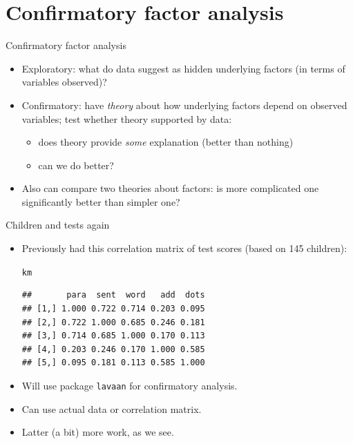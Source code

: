 \documentclass[unknownkeysallowed]{beamer}\usepackage[]{graphicx}\usepackage[]{color}
\makeatletter
\newcommand{\hlstd}[1]{\textcolor[rgb]{0.345,0.345,0.345}{#1}}%
\newenvironment{kframe}{%
 \def\at@end@of@kframe{}%
 \ifinner\ifhmode%
  \def\at@end@of@kframe{\end{minipage}}%
  \begin{minipage}{\columnwidth}%
 \fi\fi%
 \def\FrameCommand##1{\hskip\@totalleftmargin \hskip-\fboxsep
 \colorbox{shadecolor}{##1}\hskip-\fboxsep
     \hskip-\linewidth \hskip-\@totalleftmargin \hskip\columnwidth}%
 \MakeFramed {\advance\hsize-\width
   \@totalleftmargin\z@ \linewidth\hsize
   \@setminipage}}%
 {\par\unskip\endMakeFramed%
 \at@end@of@kframe}
\newenvironment{knitrout}{}{} %
\makeatother
\begin{document}
\section{Confirmatory factor analysis}
\frame{\sectionpage}


\begin{frame}[fragile]{Confirmatory factor analysis}

  \begin{itemize}
  \item Exploratory: what do data suggest as hidden underlying factors (in terms of variables observed)?
  \item Confirmatory: have {\em theory} about how underlying factors depend on observed variables; test whether theory supported by data:
    \begin{itemize}
    \item does theory provide {\em some} explanation (better than nothing)
    \item can we do better?
    \end{itemize}
  \item Also can compare two theories about factors: is more complicated one significantly better than simpler one?
  \end{itemize}
  
\end{frame}

\begin{frame}[fragile]{Children and tests again}

\begin{itemize}
\item
Previously had this correlation matrix of test scores (based on 145
children):

\begin{knitrout}
\color{fgcolor}\begin{kframe}
\begin{alltt}
\hlstd{km}
\end{alltt}
\begin{verbatim}
##       para  sent  word   add  dots
## [1,] 1.000 0.722 0.714 0.203 0.095
## [2,] 0.722 1.000 0.685 0.246 0.181
## [3,] 0.714 0.685 1.000 0.170 0.113
## [4,] 0.203 0.246 0.170 1.000 0.585
## [5,] 0.095 0.181 0.113 0.585 1.000
\end{verbatim}
\end{kframe}
\end{knitrout}

\item Will use package \texttt{lavaan} for confirmatory analysis.
\item Can use actual data or correlation matrix.
\item Latter (a bit) more work, as we see.

\end{itemize}
\end{frame}
\end{document}
